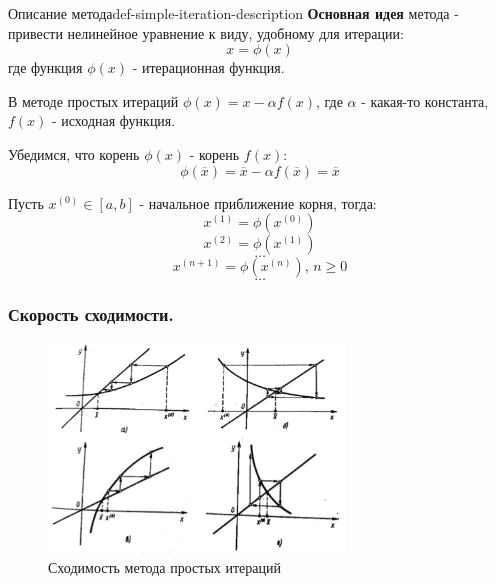 \documentclass[14pt]{extarticle}
\begin{document}
        \begin{definition}{Описание метода}{def-simple-iteration-description}
            \textbf{Основная идея} метода - привести нелинейное уравнение к виду, удобному для итерации:
            $$x = \phi(x)$$
            где функция $\phi(x)$ - итерационная функция.
            
            \vspace{\baselineskip}

            В методе простых итераций $\phi(x) = x - \alpha f(x)$, где $\alpha$ - какая-то константа, $f(x)$ - исходная функция. 
            
            \vspace{\baselineskip}

            Убедимся, что корень $\phi(x)$ - корень $f(x)$: 
            $$\phi(\overline{x}) = \overline{x} - \alpha f(\overline{x}) = \overline{x}$$

            Пусть $x^{(0)} \in [a, b]$ - начальное приближение корня, тогда:
            $$x^{(1)} = \phi(x^{(0)})$$
            $$x^{(2)} = \phi(x^{(1)})$$
            $$\ldots$$
            $$x^{(n + 1)} = \phi(x^{(n)}) \text{, } n \geq 0$$
            $$\ldots$$
        \end{definition}

    \subsubsection{Скорость сходимости.}

        \begin{figure}[H]
            \centering
            \includegraphics[width=0.7\textwidth]{images/simple-iterations-convergence.png}
            \caption{Сходимость метода простых итераций}
            \label{fig:simple-iterations-example}
        \end{figure}
\end{document}
